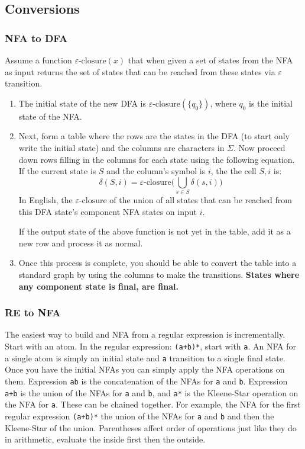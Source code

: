 \subsection{Conversions}
\newcommand{\eclose}{\varepsilon\text{-closure}}
\subsubsection{NFA to DFA}
Assume a function $\eclose(x)$ that when given a set of states from the
NFA as input returns the set of states that can be reached from these states
via $\varepsilon$ transition.
\begin{enumerate}
    \item The initial state of the new DFA is $\eclose(\{q_0\})$, where $q_0$ is
    the initial state of the NFA.
    \item Next, form a table where the rows are the states in the DFA (to start
    only write the initial state) and the columns are characters in $\Sigma$.
    Now proceed down rows filling in the columns for each state using the following
    equation. If the current state is $S$ and the column's symbol is $i$, the
    the cell $S, i$ is:
    \[
        \delta(S, i) = \eclose\big(\bigcup_{s \in S} \delta(s, i)\big)
    \]
    In English, the $\eclose$ of the union of all states that can be reached 
    from this DFA state's component NFA states on input $i$.

    If the output state of the above function is not yet in the table, add it
    as a new row and process it as normal.
    \item Once this process is complete, you should be able to convert the
    table into a standard graph by using the columns to make the transitions.
    \textbf{States where any component state is final, are final.}
\end{enumerate}
\subsubsection{RE to NFA}
The easiest way to build and NFA from a regular expression is incrementally. Start
with an atom. In the regular expression: \verb|(a+b)*|, start with \verb|a|. An
NFA for a single atom is simply an initial state and \verb|a| transition to a
single final state. Once you have the initial NFAs you can simply apply the
NFA operations on them. Expression \verb|ab| is the concatenation of the NFAs
for \verb|a| and \verb|b|. Expression \verb|a+b| is the union of the NFAs for 
\verb|a| and \verb|b|, and \verb|a*| is the Kleene-Star operation on the NFA for
\verb|a|. These can be chained together. For example, the NFA for the first
regular expression \verb|(a+b)*| the union of the NFAs for \verb|a| and \verb|b|
and then the Kleene-Star of the union. Parentheses affect order of operations
just like they do in arithmetic, evaluate the inside first then the outside.

